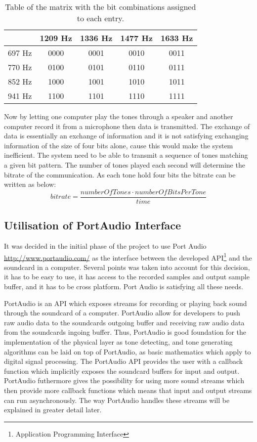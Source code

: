 	\begin{table}[htb]
		\begin{center}
			\begin{tabular}{c|c c c c}
			 & 1209 Hz & 1336 Hz & 1477 Hz & 1633 Hz \\
			\hline
			697 Hz & 0000 & 0001 & 0010 & 0011 \\
			770 Hz & 0100 & 0101 & 0110 & 0111 \\
			852 Hz & 1000 & 1001 & 1010 & 1011 \\
			941 Hz & 1100 & 1101 & 1110 & 1111 \\
			\end{tabular}
		\end{center}
		\caption{Table of the matrix with the bit combinations assigned to each entry.}
		\label{tab:DTMF_mapping}
	\end{table}
	
	Now by letting one computer play the tones through a speaker and another computer record it from
	a microphone then data is transmitted. The exchange of data is essentially an exchange
	of information and it is not satisfying exchanging information of the size of four bits alone,
	cause this would make the system inefficient. The system need to be able to transmit a sequence
	of tones matching a given bit pattern. The number of tones played each second will determine the
	bitrate of the communication. As each tone hold four bits the bitrate can be written as below:
	\begin{equation}bitrate = \frac{numberOfTones \cdot numberOfBitsPerTone}{time}\end{equation}
	
	\subsection{Utilisation of PortAudio Interface}
	It was decided in the initial phase of the project to use Port Audio \url{http://www.portaudio.com/}
	as the interface between the developed API\footnote{Application Programming Interface} and the 
	soundcard in a computer. Several points was taken into account for this decision, it has to be easy to use,
	it has access to the recorded samples and output sample buffer, and it has to be cross platform.
	Port Audio is satisfying all these needs.
	
	PortAudio is an API which exposes streams for recording or playing back sound through the soundcard of a
	computer. PortAudio allow for developers to push raw audio data to the soundcards outgoing buffer and
	receiving raw audio data from the soundcards ingoing buffer. Thus, PortAudio is good foundation for the
	implementation of the physical layer as tone detecting, and tone generating algorithms can be laid on top
	of PortAudio, as basic mathematics which apply to digital signal processing. The PortAudio API provides the
	user with a callback function which implicitly exposes the soundcard buffers for input and output. PortAudio
	futhermore gives the possibility for using more sound streams which then provide more callback functions
	which means that input and output streams can run asynchronously. The way PortAudio handles these streams
	will be explained in greater detail later.
	
